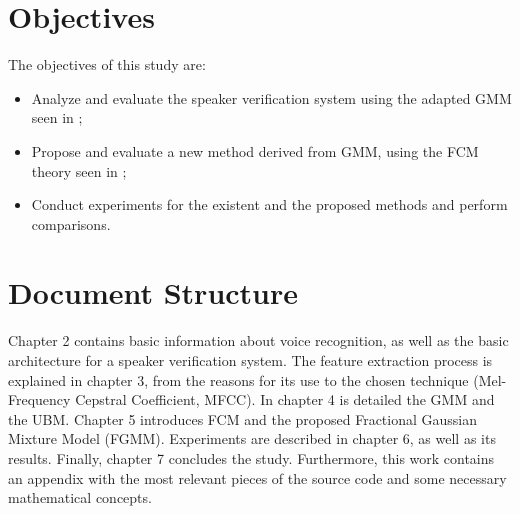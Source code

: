 \section{Objectives}

The objectives of this study are:

\begin{itemize}\itemsep0pt
    \item Analyze and evaluate the speaker verification system using the adapted GMM seen in \cite{reynolds.quatieri.dunn.2000};
    \item Propose and evaluate a new method derived from GMM, using the FCM theory seen in \cite{gao.zhou.pu.2013};
    \item Conduct experiments for the existent and the proposed methods and perform comparisons.
\end{itemize}

\section{Document Structure}

Chapter 2 contains basic information about voice recognition, as well as the basic architecture for a speaker verification system. The feature extraction process is explained in chapter 3, from the reasons for its use to the chosen technique (Mel-Frequency Cepstral Coefficient, MFCC). In chapter 4 is detailed the GMM and the UBM. Chapter 5 introduces FCM and the proposed Fractional Gaussian Mixture Model (FGMM). Experiments are described in chapter 6, as well as its results. Finally, chapter 7 concludes the study. Furthermore, this work contains an appendix with the most relevant pieces of the source code and some necessary mathematical concepts.